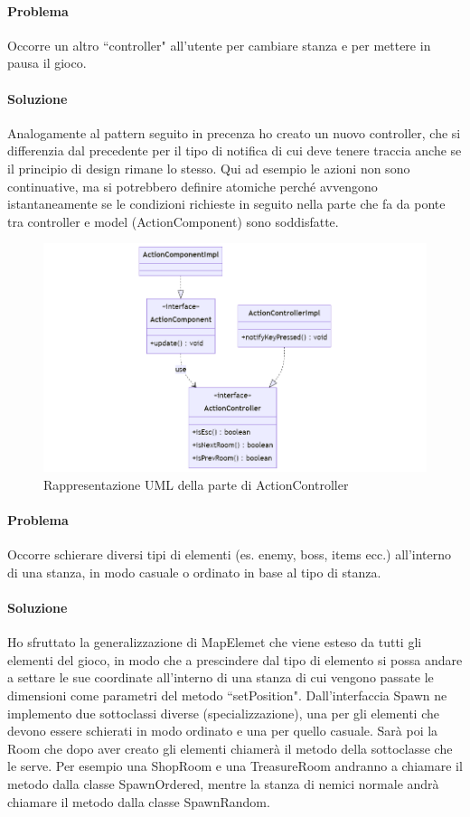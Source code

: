 \documentclass[a4paper,12pt]{report}
\begin{document}
\paragraph{Problema} Occorre un altro ``controller" all'utente per cambiare stanza e per mettere in pausa il gioco. 
\paragraph{Soluzione} Analogamente al pattern seguito in precenza ho creato un nuovo controller, che si differenzia dal precedente per il tipo di notifica di cui deve tenere traccia anche se il principio di design rimane lo stesso. Qui ad esempio le azioni non sono continuative, ma si potrebbero definire atomiche perché avvengono istantaneamente se le condizioni richieste in seguito nella parte che fa da ponte tra controller e model (ActionComponent) sono soddisfatte.
\begin{figure}[H]
    \centering{}
    \includegraphics[scale=0.4]{diagram/ActionComponent.png}
    \caption{Rappresentazione UML della parte di ActionController}
    \label{img:ActionComponent}
\end{figure}

\paragraph{Problema} Occorre schierare diversi tipi di elementi (es. enemy, boss, items ecc.) all'interno di una stanza, in modo casuale o ordinato in base al tipo di stanza.
\paragraph{Soluzione} Ho sfruttato la generalizzazione di MapElemet che viene esteso da tutti gli elementi del gioco, in modo che a prescindere dal tipo di elemento si possa andare a settare le sue coordinate all'interno di una stanza di cui vengono passate le dimensioni come parametri del metodo ``setPosition". Dall'interfaccia Spawn ne implemento due sottoclassi diverse (specializzazione), una per gli elementi che devono essere schierati in modo ordinato e una per quello casuale. Sarà poi la Room che dopo aver creato gli elementi chiamerà il metodo della sottoclasse che le serve. Per esempio una ShopRoom e una TreasureRoom andranno a chiamare il metodo dalla classe SpawnOrdered, mentre la stanza di nemici normale andrà chiamare il metodo dalla classe SpawnRandom.
\end{document}
